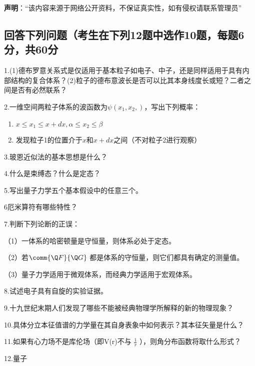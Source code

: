 
\textbf{声明}：“该内容来源于网络公开资料，不保证真实性，如有侵权请联系管理员”

\subsection{回答下列问题（考生在下列12题中选作10题，每题6分，共60分}

1.(1)德布罗意关系式是仅适用于基本粒子如电子、中子，还是同样适用于具有内部结构的复合体系？(2)粒子的德布意波长是否可以比其本身线度长或短？二者之间是否有必然联系？

2.一维空间两粒子体系的波函数为$\psi (x_1, x_2, )$，写出下列概率：
\begin{enumerate}
    \item $x \leq x_1 \leq x + dx, \alpha \leq x_2 \leq \beta$
    \item 发现粒子1的位置介于$x$和$x + dx$之间（不对粒子2进行观察）
\end{enumerate}

3.玻恩近似法的基本思想是什么？

4.什么是束缚态？什么是定态？

5.写出量子力学五个基本假设中的任意三个。

6厄米算符有哪些特性？

7.判断下列论断的正误：

（1）一体系的哈密顿量是守恒量，则体系必处于定态。

（2）若$\comm{\Q F}{\Q G}$ 都是体系的守恒量，则它们都具有确定的测量值。

（3）量子力学适用于微观体系，而经典力学适用于宏观体系。

8.试述电子具有自旋的实验证据。

9.十九世纪末期人们发现了哪些不能被经典物理学所解释的新的物理现象？

10.具体分立本征值谱的力学量在其自身表象中如何表示？其本征矢量是什么？

11.如果有心力场不是库伦场（即V(r)不与 $\frac{1}{r}$ ），则角分布函数将取什么形式？

12.量子